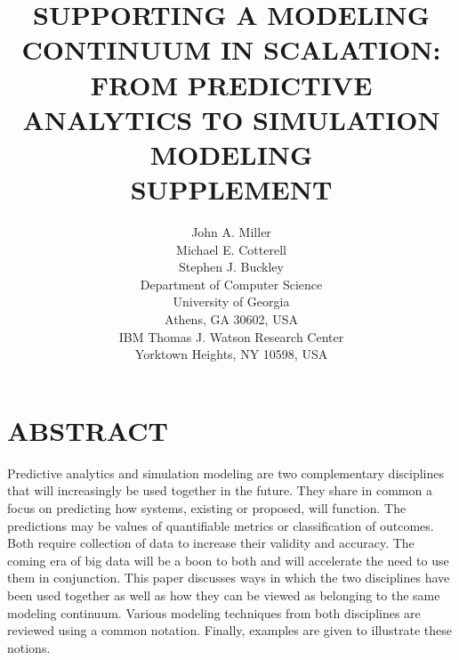 \documentclass{wscpaperproc}
\theoremstyle{wsc}
\begin{document}
%
%

\title{SUPPORTING A MODELING CONTINUUM IN SCALATION:\\FROM PREDICTIVE ANALYTICS TO SIMULATION MODELING\\SUPPLEMENT}

\author{John A. Miller \\
        Michael E. Cotterell \\
        Stephen J. Buckley \\ [12pt]
  Department of Computer Science \\
  University of Georgia \\
  Athens, GA 30602, USA \\ [12pt]
  IBM Thomas J. Watson Research Center \\
  Yorktown Heights, NY 10598, USA
}

\maketitle

\section*{ABSTRACT}

Predictive analytics and simulation modeling are two complementary disciplines 
that will increasingly be used together in the future.
They share in common a focus on predicting how systems, existing or proposed, will function.
The predictions may be values of quantifiable metrics or classification of outcomes.
Both require collection of data to increase their validity and accuracy.
The coming era of big data will be a boon to both and will accelerate the
need to use them in conjunction.
This paper discusses ways in which the two disciplines have been used
together as well as how they can be viewed as belonging to the same modeling continuum.
Various modeling techniques from both disciplines are reviewed using a common notation.
Finally, examples are given to illustrate these notions.
\end{document}
